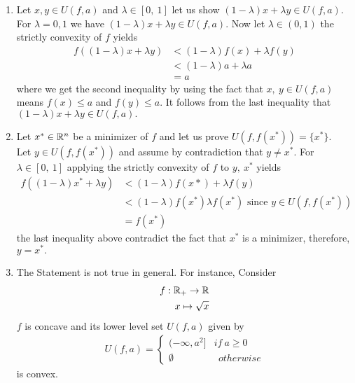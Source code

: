 \documentclass{ExerciseSheet}
\begin{document}
\begin{solution}
\begin{enumerate}
    \item Let $x,y\in  U(f,a)$ and $\lambda\in [0,~1]$ let us show $(1-\lambda)x+\lambda y\in  U(f,a).$\\
    For $\lambda=0,1$ we have  $(1-\lambda)x+\lambda y\in  U(f,a).$ 
  Now let $\lambda\in (0,1)$ the strictly convexity of $f$ yields
  \begin{align*}
      f( (1-\lambda)x+\lambda y) &< (1-\lambda)f(x)                                 +\lambda f(y)\\
                                &<(1-\lambda)a+\lambda a\\
                                &=a
  \end{align*}
where we get the second inequality by using the fact that $x,~y\in U(f,a)$ means $f(x)\leq a$ and $f(y)\leq a.$ It follows from the last inequality that $(1-\lambda)x+\lambda y\in U(f,a).$
 \item Let $x^*\in\mathbb{R}^n$ be a minimizer of $f$ and let us prove $U\left(f,f(x^*)\right)=\{x^*\}.$\\
 Let $y\in U\left(f,f(x^*)\right)$ and assume by contradiction that $y\neq x^*.$ For $\lambda\in [0,~1]$ applying the strictly convexity of $f$ to $y,~x^*$ yields  
   \begin{align*}
       f( (1-\lambda)x^*+\lambda y) &< (1-\lambda)f(x*) +\lambda f(y)\\
       &< (1-\lambda)f(x^*) \lambda f(x^*) \text{ since $y\in U\left(f,f(x^*)\right)$}\\
       &=f(x^*)
   \end{align*}
 the last inequality above contradict the fact that $x^*$ is a minimizer, therefore, $y=x^*.$ 
 \item The Statement is not true in general. For instance,
 Consider \begin{align*}
         f: \mathbb{R}_+\to \mathbb{R}\\
         x \mapsto \sqrt{x}
 \end{align*}
  $f$ is concave and its lower level set $U(f,a)$ given by
    \begin{align*}
        U(f,a)=\begin{cases}
            (-\infty, a^2] &if ~a\geq 0\\
            \emptyset    &~~otherwise
        \end{cases}
    \end{align*}
    is convex.
\end{enumerate}
\end{solution}
\end{document}
